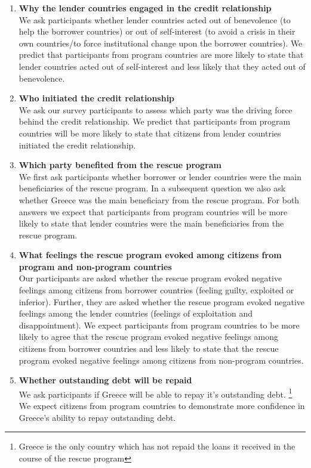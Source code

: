 \documentclass[12pt]{article}
\begin{document}
\begin{enumerate} 
\item\textbf{Why the lender countries engaged in the credit relationship} \\
We ask participants whether lender countries acted out of benevolence (to help the borrower countries) or out of self-interest (to avoid a crisis in their own countries/to force institutional change upon the borrower countries). We predict that participants from program countries are more likely to state that lender countries acted out of self-interest and less likely that they acted out of benevolence. 

\item \textbf{Who initiated the credit relationship} \\
We ask our survey participants to assess which party was the driving force behind the credit relationship. We predict that participants from program countries will be more likely to state that citizens from lender countries initiated the credit relationship. 

\item \textbf{Which party benefited from the rescue program}\\ 
We first ask participants whether borrower or lender countries were the main beneficiaries of the rescue program. In a subsequent question we also ask whether Greece was the main beneficiary from the rescue program. For both answers we expect that participants from program countries will be more likely to state that lender countries were the main beneficiaries from the rescue program. 

\item \textbf{ What feelings the rescue program evoked among citizens from program and non-program countries}\\
Our participants are asked whether the rescue program evoked negative feelings among citizens from borrower countries (feeling guilty, exploited or inferior). Further, they are asked whether the rescue program evoked negative feelings among the lender countries (feelings of exploitation and disappointment).  
We expect participants from program countries to be more likely to agree that the rescue program evoked negative feelings among citizens from borrower countries and less likely to state that the rescue program evoked negative feelings among citizens from non-program countries. 
\item \textbf{Whether outstanding debt will be repaid} \\
We ask participants if Greece will be able to repay it's outstanding debt. \footnote{Greece is the only country which has not repaid the loans it received in the course of the rescue program} We expect citizens from program countries to demonstrate more confidence in Greece's ability to repay outstanding debt. 
\end{enumerate}
\end{document}
